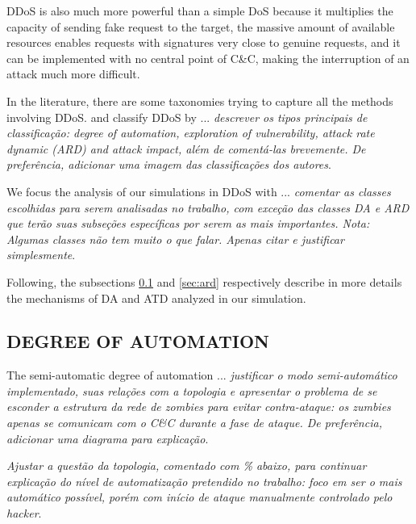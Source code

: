 \documentclass[a4paper,twoside]{article}
\begin{document}
DDoS is also much more powerful than a simple DoS because it multiplies the capacity of sending fake request to the target, the massive amount of available resources enables requests with signatures very close to genuine requests, and it can be implemented with no central point of C\&C, making the interruption of an attack much more difficult.

In the literature, there are some taxonomies trying to capture all the methods involving DDoS. \cite{Mirkovic:2004} and \cite{Bhardwaj:2016} classify DDoS by ... \emph{descrever os tipos principais de classificação: degree of automation, exploration of vulnerability, attack rate dynamic (ARD) and attack impact, além de comentá-las brevemente. De preferência, adicionar uma imagem das classificações dos autores}.

We focus the analysis of our simulations in DDoS with ... \emph{comentar as classes escolhidas para serem analisadas no trabalho, com exceção das classes DA e ARD que terão suas subseções específicas por serem as mais importantes. Nota: Algumas classes não tem muito o que falar. Apenas citar e justificar simplesmente}.

Following, the subsections \ref{sec:da} and \ref{sec:ard} respectively describe in more details the mechanisms of DA and ATD analyzed in our simulation.

\subsection{\uppercase{Degree of automation}} \label{sec:da}

The semi-automatic degree of automation ... \emph{justificar o modo semi-automático implementado, suas relações com a topologia e apresentar o problema de se esconder a estrutura da rede de zombies para evitar contra-ataque: os zumbies apenas se comunicam com o C\&C durante a fase de ataque. De preferência, adicionar uma diagrama para explicação}.

\emph{Ajustar a questão da topologia, comentado com \% abaixo, para continuar explicação do nível de automatização pretendido no trabalho: foco em ser o mais automático possível, porém com início de ataque manualmente controlado pelo hacker}.
\end{document}
